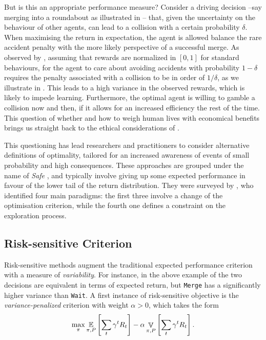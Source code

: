 But is this an appropriate performance measure? Consider a driving decision --say merging into a roundabout as illustrated in -- that, given the uncertainty on the behaviour of other agents, can lead to a collision with a certain probability $\delta$. When maximising the return in expectation, the agent is allowed balance the rare accident penalty with the more likely perspective of a successful merge. As observed by \citet{ShalevShwartz2017}, assuming that rewards are normalized in $[0, 1]$ for standard behaviours, for the agent to care about avoiding accidents with probability $1-\delta$ requires the penalty associated with a collision to be in order of $1/\delta$, as we illustrate in . This leads to a high variance in the observed rewards, which is likely to impede learning. 
Furthermore, the optimal agent is willing to gamble a collision now and then, if it allows for an increased efficiency the rest of the time. This question of whether and how to weigh human lives with economical benefits brings us straight back to the ethical considerations of .

This questioning has lead researchers and practitioners to consider alternative definitions of optimality, tailored for an increased awareness of events of small probability and high consequences. These approaches are grouped under the name of \emph{Safe} , and typically involve giving up some expected performance in favour of the lower tail of the return distribution. They were surveyed by \citet{Garcia2015}, who identified four main paradigms: the first three involve a change of the optimisation criterion, while the fourth one defines a constraint on the exploration process.

\subsection{Risk-sensitive Criterion}

Risk-sensitive methods augment the traditional expected performance criterion with a measure of \textit{variability}. For instance, in the above example of  the two decisions are equivalent in terms of expected return, but \texttt{Merge} has a significantly higher variance than \texttt{Wait}.  A first instance of risk-sensitive objective is the \emph{variance-penalized} criterion \citep{Markowitz59} with weight $\alpha > 0$, which takes the form
\begin{equation*}
\max_\pi \operatorname*{\mathbb{E}}_{\pi, P} \left[\sum_t \gamma^t R_t\right] - \alpha\mathop{\mathbb{V}}_{\pi, P} \left[\sum_t \gamma^t R_t \right].
\end{equation*}

